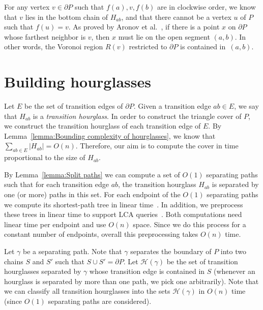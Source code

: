 \documentclass[a4paper,UKenglish]{lipics}
\newcommand{\ff}[1]{\ensuremath{f(#1)}}
\begin{document}
For any vertex $v\in \partial P$ such that  $\ff{a}, v, \ff{b}$ are in clockwise order, we know that $v$ lies in the bottom chain of $H_{ab}$, and that there cannot be a vertex $u$ of $P$ such that $\ff{u} = v$.
As proved by Aronov et al.~\cite[Corollary 2.7.4]{aronov1993furthest}, 
if there is a point $x$ on $\partial P$ whose farthest neighbor is $v$, then $x$ must lie on the open segment $(a,b)$. 
In other words, the Voronoi region $R(v)$ restricted to $\partial P$ is contained in~$(a,b)$.

\section{Building hourglasses}\label{Section: Building hourglasses}

Let $E$ be the set of transition edges of $\partial P$.
Given a transition edge $ab\in E$, we say that $H_{ab}$ is a \emph{transition hourglass}.
In order to construct the triangle cover of $P$, we construct the transition hourglass of each transition edge of $E$. By Lemma~\ref{lemma:Bounding complexity of hourglasses}, we know that $\sum_{ab\in E} |H_{ab}| = O(n)$. Therefore, our aim is to compute the cover in time proportional to the size of $H_{ab}$. %

By Lemma~\ref{lemma:Split paths} we can compute a set of $O(1)$ separating paths such that for each transition edge $ab$, the transition hourglass $H_{ab}$ is separated by one (or more) paths in this set. For each endpoint of the $O(1)$ separating paths we compute its shortest-path tree in linear time~\cite{chazelle1991triangulating,guibasShortestPathTree}. In addition, we preprocess these trees in linear time to support LCA queries~\cite{harel1984fast}. Both computations need linear time per endpoint and use $O(n)$ space. Since we do this process for a constant number of endpoints, overall this preprocessing takes $O(n)$ time. 

Let $\gamma$ be a separating path. Note that $\gamma$ separates the boundary of $P$ into two chains $S$ and $S'$ such that $S\cup S' = \partial P$.
Let $\mathcal H(\gamma)$ be the set of transition hourglasses separated by $\gamma$ whose transition edge is contained in $S$ (whenever an hourglass is separated by more than one path, we pick one arbitrarily). Note that we can classify all transition hourglasses into the sets $\mathcal H(\gamma)$ in $O(n)$ time (since $O(1)$ separating paths are considered).
\end{document}
